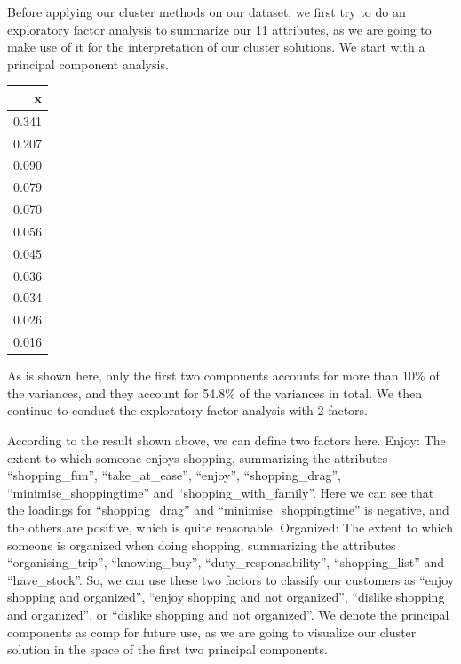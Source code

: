 \documentclass[
  11pt,
]{article}
\newenvironment{Shaded}{\begin{snugshade}}{\end{snugshade}}
\newcommand{\CommentTok}[1]{\textcolor[rgb]{0.56,0.35,0.01}{\textit{#1}}}
\newcommand{\DecValTok}[1]{\textcolor[rgb]{0.00,0.00,0.81}{#1}}
\newcommand{\FunctionTok}[1]{\textcolor[rgb]{0.00,0.00,0.00}{#1}}
\newcommand{\NormalTok}[1]{#1}
\newcommand{\SpecialCharTok}[1]{\textcolor[rgb]{0.00,0.00,0.00}{#1}}
\begin{document}
Before applying our cluster methods on our dataset, we first try to do an exploratory factor analysis to summarize our 11 attributes, as we are going to make use of it for the interpretation of our cluster solutions.
We start with a principal component analysis.

\begin{Shaded}
\end{Shaded}

\begin{tabular}[t]{r}
\hline
x\\
\hline
0.341\\
\hline
0.207\\
\hline
0.090\\
\hline
0.079\\
\hline
0.070\\
\hline
0.056\\
\hline
0.045\\
\hline
0.036\\
\hline
0.034\\
\hline
0.026\\
\hline
0.016\\
\hline
\end{tabular}

As is shown here, only the first two components accounts for more than 10\% of the variances, and they account for 54.8\% of the variances in total.
We then continue to conduct the exploratory factor analysis with 2 factors.

According to the result shown above, we can define two factors here.
Enjoy: The extent to which someone enjoys shopping, summarizing the attributes ``shopping\_fun'', ``take\_at\_ease'', ``enjoy'', ``shopping\_drag'', ``minimise\_shoppingtime'' and ``shopping\_with\_family''. Here we can see that the loadings for ``shopping\_drag'' and ``minimise\_shoppingtime'' is negative, and the others are positive, which is quite reasonable.
Organized: The extent to which someone is organized when doing shopping, summarizing the attributes ``organising\_trip'', ``knowing\_buy'', ``duty\_responsability'', ``shopping\_list'' and ``have\_stock''.
So, we can use these two factors to classify our customers as ``enjoy shopping and organized'', ``enjoy shopping and not organized'', ``dislike shopping and organized'', or ``dislike shopping and not organized''.
We denote the principal components as comp for future use, as we are going to visualize our cluster solution in the space of the first two principal components.
\end{document}
